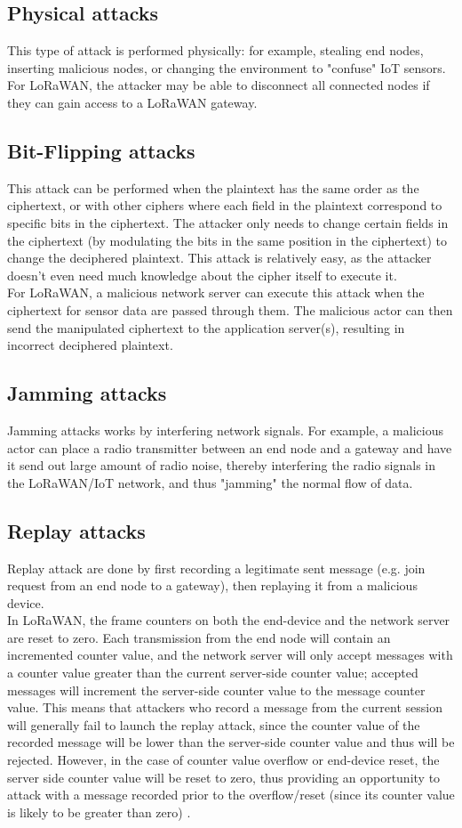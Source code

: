 \documentclass{article}
\begin{document}
\subsection{Physical attacks}
This type of attack is performed physically: for example, stealing end nodes, inserting malicious nodes, or changing the environment to "confuse" IoT sensors. For LoRaWAN, the attacker may be able to disconnect all connected nodes if they can gain access to a LoRaWAN gateway.
\subsection{Bit-Flipping attacks}
This attack can be performed when the plaintext has the same order as the ciphertext, or with other ciphers where each field in the plaintext correspond to specific bits in the ciphertext. The attacker only needs to change certain fields in the ciphertext (by modulating the bits in the same position in the ciphertext) to change the deciphered plaintext. This attack is relatively easy, as the attacker doesn't even need much knowledge about the cipher itself to execute it.\\
For LoRaWAN, a malicious network server can execute this attack when the ciphertext for sensor data are passed through them. The malicious actor can then send the manipulated ciphertext to the application server(s), resulting in incorrect deciphered plaintext.
\subsection{Jamming attacks}
Jamming attacks works by interfering network signals. For example, a malicious actor can place a radio transmitter between an end node and a gateway and have it send out large amount of radio noise, thereby interfering the radio signals in the LoRaWAN/IoT network, and thus "jamming" the normal flow of data.
\subsection{Replay attacks}
Replay attack are done by first recording a legitimate sent message (e.g. join request from an end node to a gateway), then replaying it from a malicious device.\\
In LoRaWAN, the frame counters on both the end-device and the network server are reset to zero. Each transmission from the end node will contain an incremented counter value, and the network server will only accept messages with a counter value greater than the current server-side counter value; accepted messages will increment the server-side counter value to the message counter value. This means that attackers who record a message from the current session will generally fail to launch the replay attack, since the counter value of the recorded message will be lower than the server-side counter value and thus will be rejected. However, in the case of counter value overflow or end-device reset, the server side counter value will be reset to zero, thus providing an opportunity to attack with a message recorded prior to the overflow/reset (since its counter value is likely to be greater than zero) \cite{8366983}.
\end{document}

